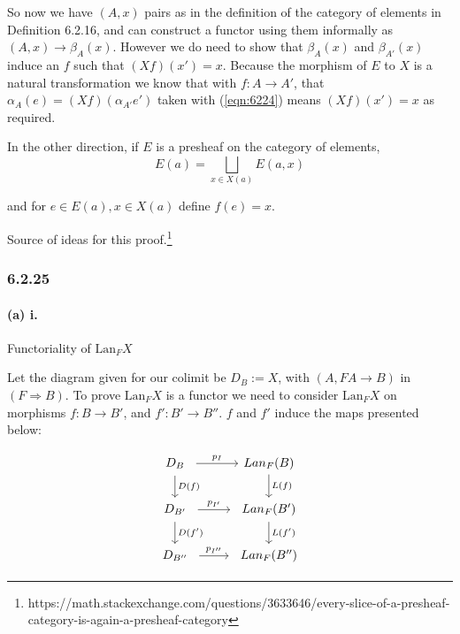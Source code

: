 \documentclass{article}
\begin{document}
So now we have $(A, x)$ pairs as in the definition of the category of elements in Definition 6.2.16, and can construct a functor using them informally as $(A, x) \rightarrow  \beta_A(x)$. However we do need to show that $\beta_A(x)$ and $\beta_{A'}(x)$ induce an $f$ such that $(Xf)(x')=x$. Because the morphism of $E$ to $X$ is a natural transformation we know that with $f\colon A \rightarrow A'$, that $\alpha_A(e) = (Xf)(\alpha_{A'}e')$ taken with (\ref{eqn:6224}) means $(Xf)(x')= x$ as required.

In the other direction, if $E$ is a presheaf on the category of elements,
\begin{equation}
  E(a) = \bigsqcup_{x \in X(a)}E(a,x)
\end{equation}

and for $e \in E(a), x \in X(a)$ define $f(e) = x$.

Source of ideas for this proof.\footnote{https://math.stackexchange.com/questions/3633646/every-slice-of-a-presheaf-category-is-again-a-presheaf-category}

\subsubsection*{6.2.25}

\paragraph{(a) i.}
Functoriality of $\text{Lan}_FX$

Let the diagram given for our colimit be $D_B:= X$, with $(A, FA \rightarrow B)$ in $\left(F \Rightarrow B\right)$. To prove $\text{Lan}_FX$ is a functor we need to consider $\text{Lan}_FX$ on morphisms $f\colon B \rightarrow B'$, and $f'\colon B' \rightarrow B''$. $f$ and $f'$ induce the maps presented below:

\begin{equation}
  \label{eqn:5391}
  \begin{tikzcd}
    \begin{array}{c}
      D_B \\
    \end{array}
    \arrow[r, "p_I"] \arrow[d, "D(f)"]
    & Lan_F(B) \arrow[d, "L(f)"] \\
    \begin{array}{c}
      D_{B'}
    \end{array}
    \arrow[r, "p_{I'}"] \arrow[d, "D(f')"]
    &
    \begin{array}{c}
      Lan_F(B') \arrow[d, "L(f')"]
    \end{array} \\
    \begin{array}{c}
      D_{B''}
    \end{array}
    \arrow[r, "p_{I''}"]
    &
    \begin{array}{c}
     Lan_F(B'')
    \end{array}
  \end{tikzcd}
\end{equation}
\end{document}
